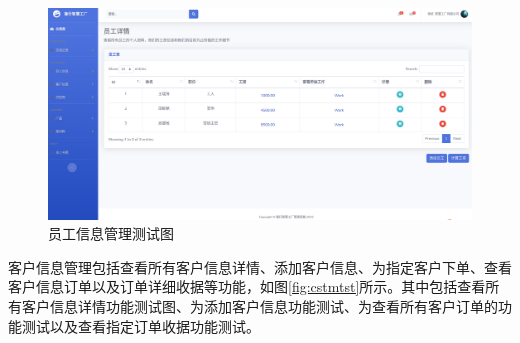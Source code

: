 \begin{figure}[H]
        \centering
        \includegraphics[width=.75\textwidth]{figures/6viewallemployee.png}
    \caption{员工信息管理测试图}
    \label{fig:emploetest}
\end{figure}

客户信息管理包括查看所有客户信息详情、添加客户信息、为指定客户下单、查看客户信息订单以及订单详细收据等功能，如图\ref{fig:cstmtst}所示。其中包括查看所有客户信息详情功能测试图、为添加客户信息功能测试、为查看所有客户订单的功能测试以及查看指定订单收据功能测试。

